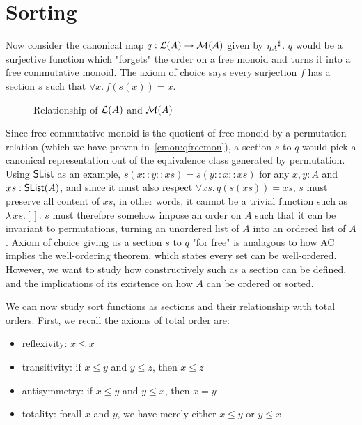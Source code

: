 \section{Sorting}
\label{sec:sorting}

Now consider the canonical map $q : \mathcal{L}(A) \to \mathcal{M}(A)$ given by ${\eta_A}^{\sharp}$. $q$ would be a surjective
function which "forgets" the order on a free monoid and turns it into a free commutative monoid.
The axiom of choice says every surjection $f$ has a section $s$ such that $\forall x.\, f(s(x)) = x$.

\begin{figure}[H]
    \centering
    \caption{Relationship of $\mathcal{L}(A)$ and $\mathcal{M}(A)$}
    \label{fig:enter-label}
\end{figure}

Since free commutative monoid is the quotient of free monoid by a permutation relation
(which we have proven in~\ref{cmon:qfreemon}), a section $s$ to $q$ would pick a canonical representation
out of the equivalence class generated by permutation.
Using $\operatorname{\mathsf{SList}}$ as an example, $s(x :: y :: xs) = s(y :: x :: xs)$ for any $x, y : A$ and $xs : \operatorname{\mathsf{SList}}(A)$,
and since it must also respect $\forall xs.\,q(s(xs)) = xs$, $s$ must preserve all content of $xs$,
in other words, it cannot be a trivial function such as $\lambda\,xs. []$.
$s$ must therefore
somehow impose an order on $A$ such that it can be invariant to permutations, turning an unordered list of $A$
into an ordered list of $A$. Axiom of choice giving us a section $s$ to $q$ "for free" is analagous to how
AC implies the well-ordering theorem, which states every set can be well-ordered. However, we want to study
how constructively such as a section can be defined, and the implications of its existence on how $A$
can be ordered or sorted.

We can now study sort functions as sections and their relationship with total orders.
First, we recall the axioms of total order are:
\begin{itemize}
    \item reflexivity: $x \leq x$
    \item transitivity: if $x \leq y$ and $y \leq z$, then $x \leq z$
    \item antisymmetry: if $x \leq y$ and $y \leq x$, then $x = y$
    \item totality: forall $x$ and $y$, we have merely either $x \leq y$ or $y \leq x$ 
\end{itemize}

